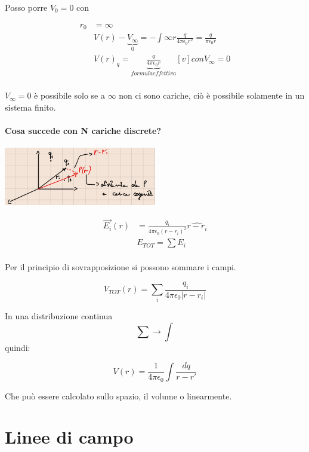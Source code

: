 \documentclass[a4paper, 12pt]{book}
\theoremstyle{plain}
\begin{document}
Posso porre $V_0 = 0$ con 

\[
\begin{split}
r_0 &= \infty \\
&V(r) - \underbrace{V_{\infty}}_0 = -\int{\infty}{r} \frac{q}{4\pi \epsilon_0 r^2} = \frac{q}{\pi \epsilon_0 r} \\
&V(r)_q = \underbrace{\frac{q}{4\pi \epsilon_0 r}}_{formula effettiva} [v] con V_{\infty} = 0 \\
\end{split}
\]

$V_{\infty} = 0$ è possibile solo se a $\infty$ non ci sono cariche, ciò è possibile solamente in un sistema finito.  

\paragraph{Cosa succede con N cariche discrete?}

\begin{center}
	\includegraphics[width=0.5\textwidth]{discrete.png}
\end{center} 

\[
\begin{split}
\vec{E_i}(r) &= \frac{q_i}{4\pi \epsilon_0(r - r_i)^2} \hat{r - r_i} \\
&E_{TOT} = \sum E_i \\
\end{split}
\]

Per il principio di sovrapposizione si possono sommare i campi.

\[
V_{TOT}(r) = \sum_i \frac{q_i}{4\pi \epsilon_0 |r - r_i|}
\]

In una distribuzione continua \[\sum \rightarrow \int\] quindi:
\begin{center}
	\[V(r) = \frac{1}{4\pi \epsilon_0} \int\frac{dq}{r-r'}\]
\end{center}

Che può essere calcolato sullo spazio, il volume o linearmente.

\section{Linee di campo}
\end{document}
